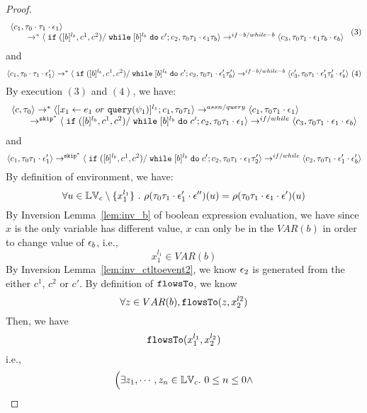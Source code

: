 \begin{proof}
\[\begin{array}{l}
 \langle c_1, \mathtt{\tau}_0 \cdot \mathtt{\tau}_1 \cdot \mathtt{\epsilon}_1 \rangle 
  \\ 
  \qquad \rightarrow^{*} 
  \langle \;\mathtt{if}\;([b]{}^{l_b}, c^1, c^2) / \;\mathtt{while}\; [b]{}^{l_b} \;\mathtt{do}\; c'; {c}_2, 
  \mathtt{\tau}_0 \mathtt{\tau}_1 \cdot \mathtt{\epsilon}_1 \mathtt{\tau}_b \rangle 
  \rightarrow^{if-b / while-b} 
  \langle {c}_3,  \mathtt{\tau}_0 \mathtt{\tau}_1 \cdot \mathtt{\epsilon}_1 \mathtt{\tau}_b \cdot \mathtt{\epsilon}_b \rangle 
\end{array} ~ (3)
 \]
and 
 \[
  \langle c_1, \mathtt{\tau}_0 \cdot \mathtt{\tau}_1 \cdot \mathtt{\epsilon}_1' \rangle 
  \rightarrow^{*} 
  \langle \;\mathtt{if}\;([b]{}^{l_b}, c^1, c^2) / \;\mathtt{while}\; [b]{}^{l_b} \;\mathtt{do}\; c'; {c}_2, 
  \mathtt{\tau}_0 \mathtt{\tau}_1 \cdot \mathtt{\epsilon}_1' \mathtt{\tau}_b' \rangle 
  \rightarrow^{if-b / while-b} 
  \langle {c}_3',  \mathtt{\tau}_0 \mathtt{\tau}_1 \cdot \mathtt{\epsilon}_1' \mathtt{\tau}_b' \cdot \mathtt{\epsilon}_b' \rangle 
  ~(4)
 \]
 By execution $(3)$ and $(4)$, we have:
\[
  \begin{array}{l}   
  \langle {c}, \mathtt{\tau}_0 \rangle 
  \rightarrow^{*} 
  \langle [\mathrel{ {x}_1 \leftarrow e_1~ or ~ {\tt query}(\psi_1) }]^{l_1} ; {c}_1, \mathtt{\tau}_0 \mathtt{\tau}_1 \rangle  \rightarrow^{assn/query}
 \langle c_1, \mathtt{\tau}_0 \mathtt{\tau}_1 \cdot \mathtt{\epsilon}_1 \rangle 
  \\ 
  \qquad \rightarrow^{\mathtt{skip}^*} 
  \langle \;\mathtt{if}\;([b]{}^{l_b}, c^1, c^2) / \;\mathtt{while}\; [b]{}^{l_b} \;\mathtt{do}\; c'; {c}_2, 
  \mathtt{\tau}_0 \mathtt{\tau}_1 \cdot \mathtt{\epsilon}_1 \rangle 
  \rightarrow^{if / while} 
  \langle {c}_3,  \mathtt{\tau}_0 \mathtt{\tau}_1 \cdot \mathtt{\epsilon}_1 \cdot \mathtt{\epsilon}_b \rangle 
\end{array}
 \]
and 
 \[
  \langle c_1, \mathtt{\tau}_0 \mathtt{\tau}_1 \cdot \mathtt{\epsilon}_1' \rangle 
  \rightarrow^{\mathtt{skip}^*} 
  \langle \;\mathtt{if}\;([b]{}^{l_b}, c^1, c^2) / \;\mathtt{while}\; [b]{}^{l_b} \;\mathtt{do}\; c'; {c}_2, 
  \mathtt{\tau}_0 \mathtt{\tau}_1 \cdot \mathtt{\epsilon}_1 \mathtt{\tau}_2' \rangle 
  \rightarrow^{if / while} 
  \langle {c}_2,  \mathtt{\tau}_0 \mathtt{\tau}_1 \cdot \mathtt{\epsilon}_1' \cdot \mathtt{\epsilon}_b' \rangle 
 \]
 By definition of environment, we have:
\[
  \forall u \in \mathbb{LV}_c \setminus \{x_1^{l_1}\} ~.~
  \rho(\mathtt{\tau}_0 \mathtt{\tau}_1 \cdot \mathtt{\epsilon}_1' \cdot \mathtt{\epsilon}'') (u) =  
  \rho(\mathtt{\tau}_0 \mathtt{\tau}_1 \cdot \mathtt{\epsilon}_1 \cdot \mathtt{\epsilon}') (u)
\]
%
By {Inversion Lemma~\ref{lem:inv_b}} of boolean expression evaluation, we have since $x$ is the only variable has different value, $x$ can only be in the $VAR(b)$ in order to change value of $\mathtt{\epsilon}_b$, i.e.,
 \[
  x_1^{l_1} \in VAR(b)
 \]
 By {Inversion Lemma~\ref{lem:inv_ctltoevent2}}, we know $\mathtt{\epsilon}_2$ is generated from the either $c^1$, $c^2$ or $c'$.
 By definition of $\mathtt{flowsTo}$, we know
 \[
 \forall z \in VAR(b), \mathtt{flowsTo}(z, x_2^{l2})
 \]
 Then, we have
 \[
 \mathtt{flowsTo}(x_1^{l_1}, x_2^{l_2})
 \]
 i.e.,
 \[
 \Big( \exists z_1, \cdots, z_n \in \mathbb{LV}_{{c}}. ~ 0 \leq n \leq 0 \land
\]
\end{proof}
